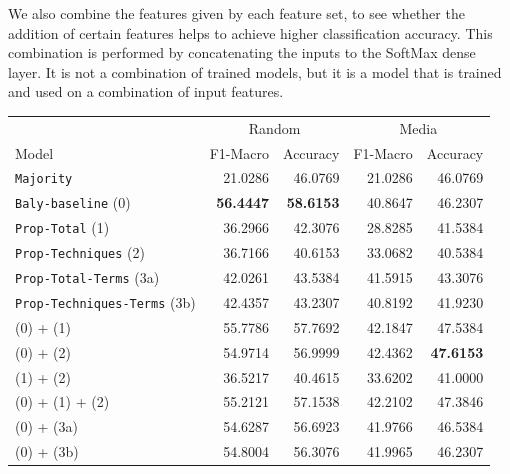 We also combine the features given by each feature set, to see whether the addition of certain features helps to achieve higher classification accuracy. %
This combination is performed by concatenating the inputs to the SoftMax dense layer. It is not a combination of trained models, but it is a model that is trained and used on a combination of input features.



\begin{table}[!htbp]
    \centering
   \scriptsize
    \begin{tabular}{l|rr|rr}
        & \multicolumn{2}{c}{Random} & \multicolumn{2}{c}{Media} \\
        Model & F1-Macro & Accuracy & F1-Macro & Accuracy \\
        \hline
        \texttt{Majority} & 21.0286 & 46.0769 & 21.0286 & 46.0769 \\
        \texttt{Baly-baseline} (0) & \textbf{56.4447} & \textbf{58.6153} & 40.8647 & 46.2307 \\
        \hline
        \texttt{Prop-Total} (1) & 36.2966 & 42.3076 & 28.8285 & 41.5384 \\
        \texttt{Prop-Techniques} (2) & 36.7166 & 40.6153 & 33.0682 & 40.5384 \\
        \texttt{Prop-Total-Terms} (3a) & 42.0261 & 43.5384 & 41.5915 & 43.3076 \\
        \texttt{Prop-Techniques-Terms} (3b) & 42.4357 & 43.2307 & 40.8192 & 41.9230 \\
        \hline
        (0) + (1) & 55.7786 & 57.7692 & 42.1847 & 47.5384 \\
        (0) + (2) & 54.9714 & 56.9999 & 42.4362 & \textbf{47.6153} \\
        (1) + (2) & 36.5217 & 40.4615 & 33.6202 & 41.0000 \\
        (0) + (1) + (2) & 55.2121 & 57.1538 & 42.2102 & 47.3846 \\
        (0) + (3a) & 54.6287 & 56.6923 & 41.9766 & 46.5384 \\
        (0) + (3b) & 54.8004 & 56.3076 & 41.9965 & 46.2307 \\

\end{tabular}
\end{table}
